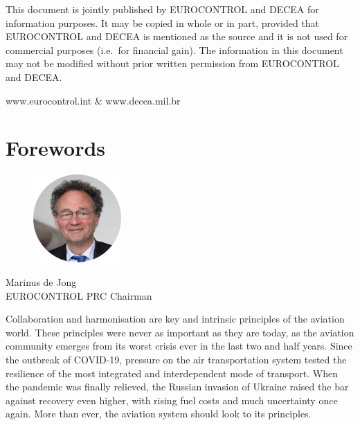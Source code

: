 \documentclass[
  a4paper,
  DIV=11,
  numbers=noendperiod]{scrreprt}
\begin{document}
This document is jointly published by EUROCONTROL and DECEA for
information purposes. It may be copied in whole or in part, provided
that EUROCONTROL and DECEA is mentioned as the source and it is not used
for commercial purposes (i.e.~for financial gain). The information in
this document may not be modified without prior written permission from
EUROCONTROL and DECEA.

www.eurocontrol.int \& www.decea.mil.br


\hypertarget{forewords}{%
\chapter*{Forewords}\label{forewords}}

\usepackage{multicol}
\pagestyle{headings}

\begin{figure}[h]

{\centering \includegraphics[width=0.3\textwidth,height=\textheight]{././figures/headshot-prc-marinus-cropped.png}

}

\end{figure}

Marinus de Jong\\
EUROCONTROL PRC Chairman

Collaboration and harmonisation are key and intrinsic principles of the
aviation world. These principles were never as important as they are
today, as the aviation community emerges from its worst crisis ever in
the last two and half years. Since the outbreak of COVID-19, pressure on
the air transportation system tested the resilience of the most
integrated and interdependent mode of transport. When the pandemic was
finally relieved, the Russian invasion of Ukraine raised the bar against
recovery even higher, with rising fuel costs and much uncertainty once
again. More than ever, the aviation system should look to its
principles.
\end{document}
